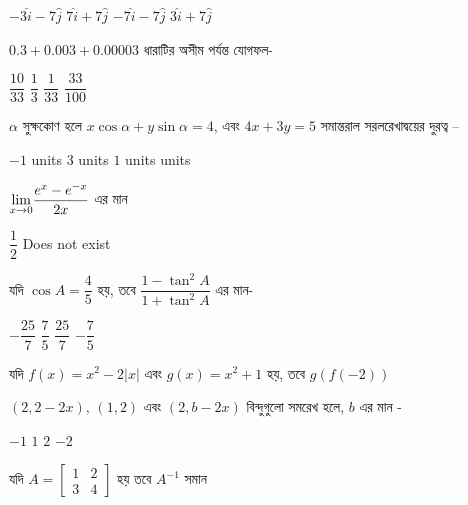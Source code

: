 \documentclass[addpoints]{exam}
\begin{document}
\begin{questions}
\begin{oneparchoices}
\choice $ -3\hat{i}-7\hat{j}  $
\choice $ 7\hat{i}+7\hat{j}  $
\choice $ -7\hat{i}-7\hat{j}  $
\choice $ 3\hat{i}+7\hat{j}  $
\end{oneparchoices}

\question $ 0.3+0.003+0.00003 $ ধারাটির অসীম পর্যন্ত যোগফল-

\begin{oneparchoices}
\choice $ \dfrac{10}{33} $
\choice $ \dfrac{1}{3} $
\choice $ \dfrac{1}{33} $
\choice $ \dfrac{33}{100} $
\end{oneparchoices}

\question  $ \alpha $ সুক্ষকোণ হলে $ x\cos\alpha + y\sin\alpha =4 $, এবং $ 4x+3y =5 $ সমান্তরাল সরলরেখাদ্বয়ের দুরত্ব – 

\begin{oneparchoices}
\choice $ -1 $ units
\choice $ 3 $ units
\choice  $ 1 $ units
 units
\end{oneparchoices}

\question  $ \mathlarger{\lim_{x\to 0}}\dfrac{e^{x}-e^{-x}}{2x} $ এর মান


\begin{oneparchoices}
\choice  $ \dfrac{1}{2} $
\choice  Does not exist
\end{oneparchoices}

\question যদি $ \cos A = \dfrac{4}{5} $ হয়, তবে $ \dfrac{1-\tan^{2} A}{1+\tan^{2}A} $ এর মান-

\begin{oneparchoices}
\choice $ -\dfrac{25}{7} $
\choice $ \dfrac{7}{5} $
\choice $ \dfrac{25}{7} $
\choice  $ -\dfrac{7}{5} $
\end{oneparchoices}

\question  যদি $ f(x) = x^{2}-2|x| $ এবং $ g(x) = x^{2}+1 $ হয়, তবে $ g(f(-2)) $  


\begin{oneparchoices}
\end{oneparchoices}

\question $ (2,2-2x),\,(1,2) $ এবং $ (2,b-2x )$ বিন্দুগুলো সমরেখ হলে, $ b $ এর মান - 

\begin{oneparchoices}
\choice $ -1 $
\choice $ 1 $
\choice $ 2 $
\choice $ -2 $
\end{oneparchoices}

\question  যদি $ A = \begin{bmatrix}
1 & 2\\
3 & 4
\end{bmatrix} $ হয় তবে $ A^{-1} $ সমান


\end{questions}
\end{document}
